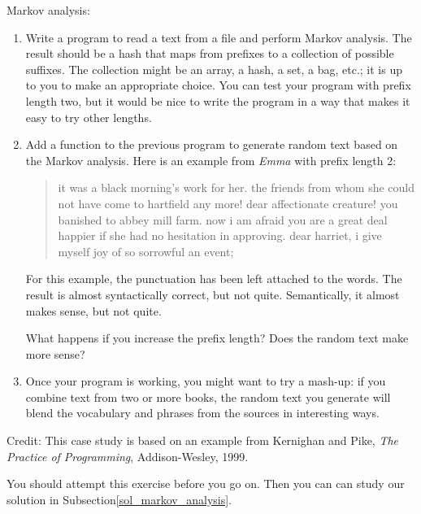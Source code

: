 \begin{exercise}

Markov analysis:
\label{markov_analysis}

\begin{enumerate}

\item Write a program to read a text from a file and perform Markov
analysis.  The result should be a hash that maps from
prefixes to a collection of possible suffixes.  The collection
might be an array, a hash, a set, a bag, etc.; it is up to you 
to make an appropriate choice.  You can test your program with 
prefix length two, but it would be nice to write the program 
in a way that makes it easy to try other lengths.

\item Add a function to the previous program to generate random text
based on the Markov analysis.  Here is an example from {\em Emma}
with prefix length 2:

\begin{quote}
it was a black morning's work for her. the friends from whom 
she could not have come to hartfield any more! dear affectionate 
creature! you banished to abbey mill farm. now i am afraid 
you are a great deal happier if she had no hesitation in 
approving. dear harriet, i give myself joy of so sorrowful an event;
\end{quote}

For this example, the punctuation has been left attached to 
the words. The result is almost syntactically correct, but not 
quite. Semantically, it almost makes sense, but not quite.

What happens if you increase the prefix length?  Does the random
text make more sense?

\item Once your program is working, you might want to try a mash-up:
if you combine text from two or more books, the random
text you generate will blend the vocabulary and phrases from
the sources in interesting ways.

\end{enumerate}

Credit: This case study is based on an example from Kernighan and
Pike, {\em The Practice of Programming}, Addison-Wesley, 1999.

\end{exercise}

You should attempt this exercise before you go on. Then you can can
study our solution in Subsection\ref{sol_markov_analysis}.


